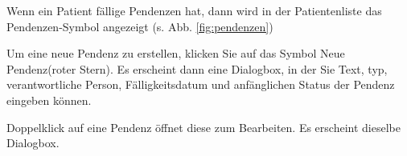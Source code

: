 Wenn ein Patient fällige Pendenzen hat, dann wird in der Patientenliste das
Pendenzen-Symbol angezeigt (s. Abb. \ref{fig:pendenzen})

Um eine neue Pendenz zu erstellen, klicken Sie auf das Symbol \glqq Neue
Pendenz\grqq{}(roter Stern). Es erscheint dann eine Dialogbox, in der Sie Text,
typ, verantwortliche Person, Fälligkeitsdatum und anfänglichen Status der
Pendenz eingeben können.

Doppelklick auf eine Pendenz öffnet diese zum Bearbeiten. Es erscheint dieselbe
Dialogbox.

